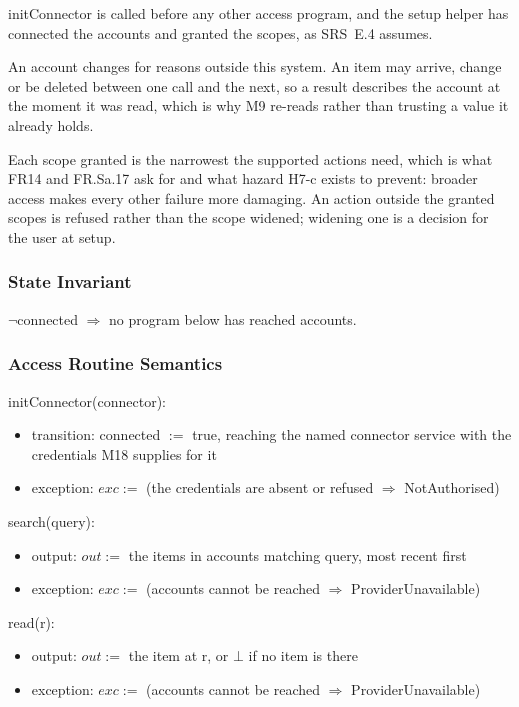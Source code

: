 \documentclass[12pt, titlepage]{article}
\newcommand{\nil}{\bot}
\begin{document}
initConnector is called before any other access program, and the setup helper
has connected the accounts and granted the scopes, as SRS~E.4 assumes.

\noindent An account changes for reasons outside this system. An item may
arrive, change or be deleted between one call and the next, so a result
describes the account at the moment it was read, which is why M9 re-reads rather
than trusting a value it already holds.

\noindent Each scope granted is the narrowest the supported actions need, which
is what FR14 and FR.Sa.17 ask for and what hazard H7-c exists to prevent:
broader access makes every other failure more damaging. An action outside the
granted scopes is refused rather than the scope widened; widening one is a
decision for the user at setup.

\subsubsection{State Invariant}

$\lnot$connected $\Rightarrow$ no program below has reached accounts.

\subsubsection{Access Routine Semantics}

\noindent initConnector(connector):
\begin{itemize}
\item transition: connected $:=$ true, reaching the named connector service
with the credentials M18 supplies for it
\item exception: $exc :=$ (the credentials are absent or refused $\Rightarrow$
NotAuthorised)
\end{itemize}

\noindent search(query):
\begin{itemize}
\item output: $out :=$ the items in accounts matching query, most recent first
\item exception: $exc :=$ (accounts cannot be reached $\Rightarrow$
ProviderUnavailable)
\end{itemize}

\noindent read(r):
\begin{itemize}
\item output: $out :=$ the item at r, or $\nil$ if no item is there
\item exception: $exc :=$ (accounts cannot be reached $\Rightarrow$
ProviderUnavailable)
\end{itemize}
\end{document}

